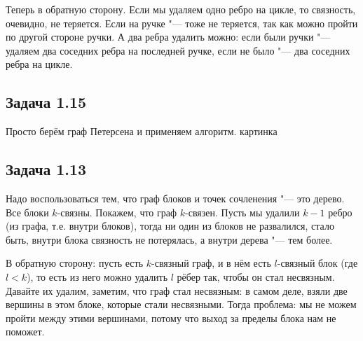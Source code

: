 	Теперь в обратную сторону.
	Если мы удаляем одно ребро на цикле, то связность, очевидно, не теряется.
	Если на ручке "--- тоже не теряется, так как можно пройти по другой стороне ручки.
	А два ребра удалить можно: если были ручки "--- удаляем два соседних ребра на последней ручке,
	если не было "--- два соседних ребра на цикле.

\subsection{Задача 1.15}
	Просто берём граф Петерсена и применяем алгоритм.
	\TODO картинка

\subsection{Задача 1.13}
	Надо воспользоваться тем, что граф блоков и точек сочленения "--- это дерево.
	Все блоки $k$-связны.
	Покажем, что граф $k$-связен.
	Пусть мы удалили $k-1$ ребро (из графа, т.е. внутри блоков), тогда ни один из блоков не развалился, стало быть,
	внутри блока связность не потерялась, а внутри дерева "--- тем более.

	В обратную сторону: пусть есть $k$-связный граф, и в нём есть $l$-связный блок (где $l<k$),
	то есть из него можно удалить $l$ рёбер так, чтобы он стал несвязным.
	Давайте их удалим, заметим, что граф стал несвязным: в самом деле, взяли две вершины в этом блоке,
	которые стали несвязными.
	Тогда проблема: мы не можем пройти между этими вершинами, потому что выход за пределы блока нам не поможет.
